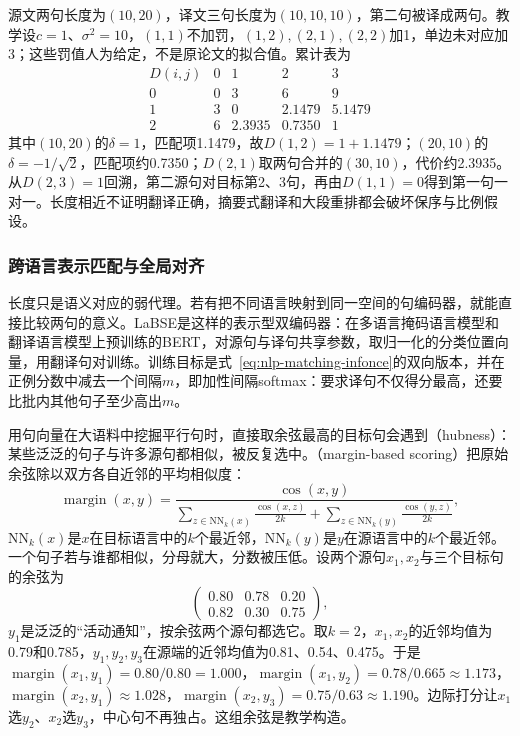 源文两句长度为$(10,20)$，译文三句长度为$(10,10,10)$，第二句被译成两句。教学设$c=1$、$\sigma^2=10$，$(1,1)$不加罚，$(1,2),(2,1),(2,2)$加1，单边未对应加3；这些罚值人为给定，不是原论文的拟合值。累计表为
\[
 \begin{array}{c|rrrr}
 D(i,j)&0&1&2&3\\ \hline
 0&0&3&6&9\\
 1&3&0&2.1479&5.1479\\
 2&6&2.3935&0.7350&1
 \end{array}
\]
其中$(10,20)$的$\delta=1$，匹配项1.1479，故$D(1,2)=1+1.1479$；$(20,10)$的$\delta=-1/\sqrt2$，匹配项约0.7350；$D(2,1)$取两句合并的$(30,10)$，代价约2.3935。从$D(2,3)=1$回溯，第二源句对目标第2、3句，再由$D(1,1)=0$得到第一句一对一。长度相近不证明翻译正确，摘要式翻译和大段重排都会破坏保序与比例假设。

\subsubsection{跨语言表示匹配与全局对齐}
\label{sec:nlp-classification-crosslingual-align}

长度只是语义对应的弱代理。若有把不同语言映射到同一空间的句编码器，就能直接比较两句的意义。LaBSE是这样的表示型双编码器：在多语言掩码语言模型和翻译语言模型上预训练的BERT，对源句与译句共享参数，取归一化的分类位置向量，用翻译句对训练。训练目标是式~\eqref{eq:nlp-matching-infonce}的双向版本，并在正例分数中减去一个间隔$m$，即加性间隔softmax：要求译句不仅得分最高，还要比批内其他句子至少高出$m$。

用句向量在大语料中挖掘平行句时，直接取余弦最高的目标句会遇到（hubness）：某些泛泛的句子与许多源句都相似，被反复选中。（margin-based scoring）把原始余弦除以双方各自近邻的平均相似度\cite{nlp-matching-artetxe2019margin}：
\[
  \operatorname{margin}(x,y)=\frac{\cos(x,y)}
  {\sum_{z\in\mathrm{NN}_k(x)}\frac{\cos(x,z)}{2k}+\sum_{z\in\mathrm{NN}_k(y)}\frac{\cos(y,z)}{2k}},
\]
$\mathrm{NN}_k(x)$是$x$在目标语言中的$k$个最近邻，$\mathrm{NN}_k(y)$是$y$在源语言中的$k$个最近邻。一个句子若与谁都相似，分母就大，分数被压低。设两个源句$x_1,x_2$与三个目标句的余弦为
\[
  \begin{pmatrix}0.80&0.78&0.20\\0.82&0.30&0.75\end{pmatrix},
\]
$y_1$是泛泛的“活动通知”，按余弦两个源句都选它。取$k=2$，$x_1,x_2$的近邻均值为0.79和0.785，$y_1,y_2,y_3$在源端的近邻均值为0.81、0.54、0.475。于是$\operatorname{margin}(x_1,y_1)=0.80/0.80=1.000$，$\operatorname{margin}(x_1,y_2)=0.78/0.665\approx1.173$，$\operatorname{margin}(x_2,y_1)\approx1.028$，$\operatorname{margin}(x_2,y_3)=0.75/0.63\approx1.190$。边际打分让$x_1$选$y_2$、$x_2$选$y_3$，中心句不再独占。这组余弦是教学构造。

